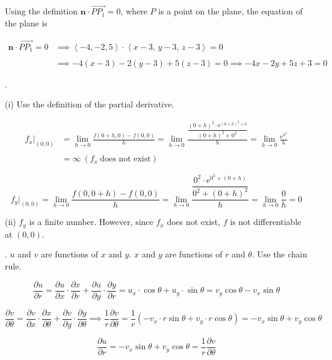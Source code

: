 \documentclass{article}
\begin{document}
\hfill

\noindent Using the definition $\mathbf{n}\cdot\overrightarrow{PP_1}=0$, where $P$ is a point on the plane, the equation of the plane is

\begin{align*}\mathbf{n}\cdot\overrightarrow{PP_1}=0&\implies\left\langle-4,-2,5\right\rangle\cdot\left\langle x-3,\,y-3,\,z-3\right\rangle=0\\\\&\implies-4(x-3)-2(y-3)+5(z-3)=0\implies\boxed{-4x-2y+5z+3=0}\end{align*}

\hfill

.

\hfill

\noindent (i) Use the definition of the partial derivative.

\begin{align*}f_x|_{(0,0)}&=\lim_{h\to0}\frac{f(0+h,0)-f(0,0)}h=\lim_{h\to0}\frac{\dfrac{(0+h)^2\cdot\mathrm{e}^{(0+h)^2+0}}{(0+h)^2+0^2}}{h}=\lim_{h\to0}\frac{\mathrm{e}^{h^2}}{h}\\\\&=\infty\:(f_x\:\text{does not exist})\end{align*}

\[f_y|_{(0,0)}=\lim_{h\to0}\frac{f(0,0+h)-f(0,0)}h=\lim_{h\to0}\frac{\dfrac{0^2\cdot\mathrm{e}^{0^2+(0+h)}}{0^2+(0+h)^2}}{h}=\lim_{h\to0}\frac{0}{h}=0\]

\hfill

\noindent (ii) $f_y$ is a finite number. However, since $f_x$ does not exist, $f$ is not differentiable at $(0,0)$.

\hfill

. $u$ and $v$ are functions of $x$ and $y$. $x$ and $y$ are functions of $r$ and $\theta$. Use the chain rule.

\[\frac{\partial u}{\partial r}=\frac{\partial u}{\partial x}\cdot\frac{\partial x}{\partial r}+\frac{\partial u}{\partial y}\cdot\frac{\partial y}{\partial r}=u_x\cdot\cos\theta+u_y\cdot\sin\theta=v_y\cos\theta-v_x\sin\theta\]

\[\frac{\partial v}{\partial\theta}=\frac{\partial v}{\partial x}\cdot\frac{\partial x}{\partial\theta}+\frac{\partial v}{\partial y}\cdot\frac{\partial y}{\partial\theta}\implies\frac1r\frac{\partial v}{\partial\theta}=\frac1r\left(-v_x\cdot r\sin\theta+v_y\cdot r\cos\theta\right)=-v_x\sin\theta+v_y\cos\theta\]

\[\frac{\partial u}{\partial r}=-v_x\sin\theta+v_y\cos\theta=\frac1r\frac{\partial v}{\partial\theta}\]
\end{document}
